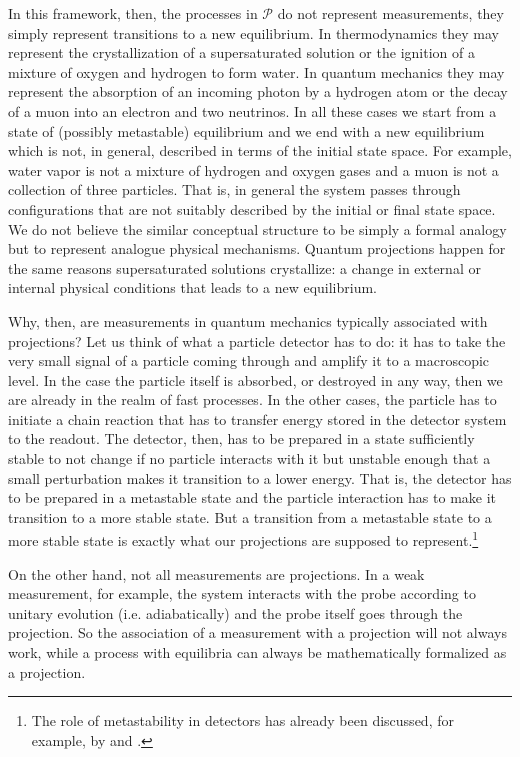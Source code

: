 \documentclass[11pt]{article}
\begin{document}
In this framework, then, the processes in $\mathcal{P}$ do not represent measurements, they simply represent transitions to a new equilibrium. In thermodynamics they may represent the crystallization of a supersaturated solution or the ignition of a mixture of oxygen and hydrogen to form water. In quantum mechanics they may represent the absorption of an incoming photon by a hydrogen atom or the decay of a muon into an electron and two neutrinos. In all these cases we start from a state of (possibly metastable) equilibrium and we end with a new equilibrium which is not, in general, described in terms of the initial state space. For example, water vapor is not a mixture of hydrogen and oxygen gases and a muon is not a collection of three particles. That is, in general the system passes through configurations that are not suitably described by the initial or final state space. We do not believe the similar conceptual structure to be simply a formal analogy but to represent analogue physical mechanisms. Quantum projections happen for the same reasons supersaturated solutions crystallize: a change in external or internal physical conditions that leads to a new equilibrium.

Why, then, are measurements in quantum mechanics typically associated with projections? Let us think of what a particle detector has to do: it has to take the very small signal of a particle coming through and amplify it to a macroscopic level. In the case the particle itself is absorbed, or destroyed in any way, then we are already in the realm of fast processes. In the other cases, the particle has to initiate a chain reaction that has to transfer energy stored in the detector system to the readout. The detector, then, has to be prepared in a state sufficiently stable to not change if no particle interacts with it but unstable enough that a small perturbation makes it transition to a lower energy. That is, the detector has to be prepared in a metastable state and the particle interaction has to make it transition to a more stable state. But a transition from a metastable state to a more stable state is exactly what our projections are supposed to represent.\footnote{The role of metastability in detectors has already been discussed, for example, by \cite{Daneri} and \cite{Merlin}.}

On the other hand, not all measurements are projections. In a weak measurement\cite{Tamir}, for example, the system interacts with the probe according to unitary evolution (i.e. adiabatically) and the probe itself goes through the projection. So the association of a measurement with a projection will not always work, while a process with equilibria can always be mathematically formalized as a projection.
\end{document}
